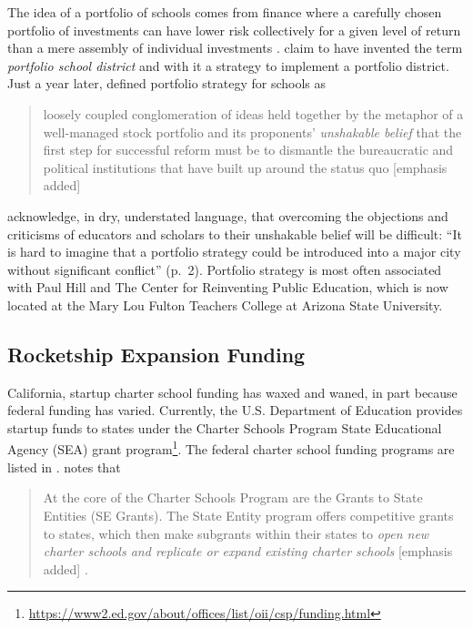 The idea of a portfolio of schools comes from finance where a carefully chosen portfolio of investments can have lower risk collectively for a given level of return than a mere assembly of individual investments \parencite[See ][for an overview of the mathematics of modern portfolio theory]{MarkowitzContributors2024}. \citeauthor{Hill.etal2009} claim to have invented the term \textit{portfolio school district} \parencite[1]{Hill.etal2009} and with it a strategy to implement a portfolio district. Just a year later, \citeauthor{Henig.etal2010} defined portfolio strategy for schools as
\begin{quotation}\noindent
[A] loosely coupled conglomeration of ideas held together by the metaphor of a well-managed stock portfolio and its proponents’ \textit{unshakable belief} that the first step for successful reform must be to dismantle the bureaucratic and political institutions that have built up around the status quo [emphasis added] \parencite{Henig.etal2010}
\end{quotation}

\citeauthor{Hill.etal2009} acknowledge, in dry, understated language, that overcoming the objections and criticisms of educators and scholars to their unshakable belief will be difficult: ``It is hard to imagine that a portfolio strategy could be introduced into a major city without significant conflict'' (p.~2). Portfolio strategy is most often associated with Paul Hill and The Center for Reinventing Public Education, which is now located at the Mary Lou Fulton Teachers College at Arizona State University.

\subsection{Rocketship Expansion Funding}\label{sec:rocketship-expansion-funding}\indent

California, startup charter school funding has waxed and waned, in part because federal funding has varied. Currently, the U.S. Department of Education provides startup funds to states under the Charter Schools Program State Educational Agency (SEA) grant program\footnote{\url{https://www2.ed.gov/about/offices/list/oii/csp/funding.html}}. The federal charter school funding programs are listed in \textcite{NCSRC2020}.  notes that 

\begin{quotation}\noindent
At the core of the Charter Schools Program are the Grants to State Entities (SE Grants). The State Entity program offers competitive grants to states, which then make subgrants within their states to \textit{open new charter schools and replicate or expand existing charter schools} [emphasis added] \parencite{NAPCS2020}.
\end{quotation}

